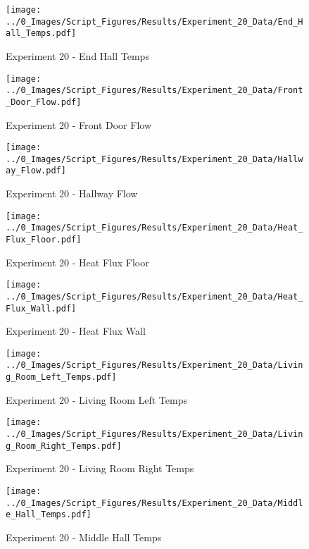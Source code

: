 	\begin{figure}[H]
		\centering
		\texttt{[image: ../0\_Images/Script\_Figures/Results/Experiment\_20\_Data/End\_Hall\_Temps.pdf]}
		\caption[]{Experiment 20 - End Hall Temps}
	\end{figure}
 
	\clearpage

	\begin{figure}[H]
		\centering
		\texttt{[image: ../0\_Images/Script\_Figures/Results/Experiment\_20\_Data/Front\_Door\_Flow.pdf]}
		\caption[]{Experiment 20 - Front Door Flow}
	\end{figure}
 

	\begin{figure}[H]
		\centering
		\texttt{[image: ../0\_Images/Script\_Figures/Results/Experiment\_20\_Data/Hallway\_Flow.pdf]}
		\caption[]{Experiment 20 - Hallway Flow}
	\end{figure}
 
	\clearpage

	\begin{figure}[H]
		\centering
		\texttt{[image: ../0\_Images/Script\_Figures/Results/Experiment\_20\_Data/Heat\_Flux\_Floor.pdf]}
		\caption[]{Experiment 20 - Heat Flux Floor}
	\end{figure}
 

	\begin{figure}[H]
		\centering
		\texttt{[image: ../0\_Images/Script\_Figures/Results/Experiment\_20\_Data/Heat\_Flux\_Wall.pdf]}
		\caption[]{Experiment 20 - Heat Flux Wall}
	\end{figure}
 
	\clearpage

	\begin{figure}[H]
		\centering
		\texttt{[image: ../0\_Images/Script\_Figures/Results/Experiment\_20\_Data/Living\_Room\_Left\_Temps.pdf]}
		\caption[]{Experiment 20 - Living Room Left Temps}
	\end{figure}
 

	\begin{figure}[H]
		\centering
		\texttt{[image: ../0\_Images/Script\_Figures/Results/Experiment\_20\_Data/Living\_Room\_Right\_Temps.pdf]}
		\caption[]{Experiment 20 - Living Room Right Temps}
	\end{figure}
 
	\clearpage

	\begin{figure}[H]
		\centering
		\texttt{[image: ../0\_Images/Script\_Figures/Results/Experiment\_20\_Data/Middle\_Hall\_Temps.pdf]}
		\caption[]{Experiment 20 - Middle Hall Temps}
	\end{figure}
 

